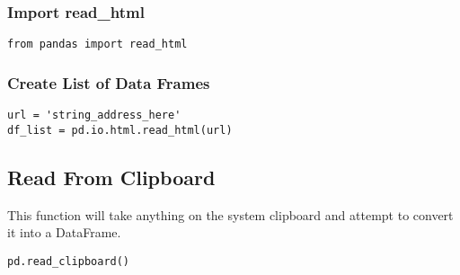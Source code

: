 %
\subsubsection{Import read\_html}
\begin{lstlisting}
from pandas import read_html
\end{lstlisting}

%
\subsubsection{Create List of Data Frames}
\begin{lstlisting}
url = 'string_address_here'
df_list = pd.io.html.read_html(url)
\end{lstlisting}

\subsection{Read From Clipboard}
This function will take anything on the system clipboard and attempt to convert
it into a DataFrame.
\begin{lstlisting}
pd.read_clipboard()
\end{lstlisting}

